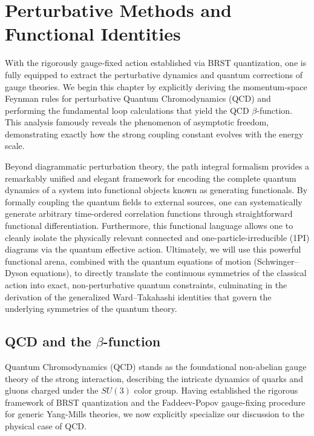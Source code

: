 \chapter[Perturbative Methods and Functional Identities]{Perturbative Methods and\\Functional Identities}

With the rigorously gauge-fixed action established via BRST quantization, one is fully equipped to extract the perturbative dynamics and quantum corrections of gauge theories. We begin this chapter by explicitly deriving the momentum-space Feynman rules for perturbative Quantum Chromodynamics (QCD) and performing the fundamental loop calculations that yield the QCD \(\beta\)-function. This analysis famously reveals the phenomenon of asymptotic freedom, demonstrating exactly how the strong coupling constant evolves with the energy scale.

Beyond diagrammatic perturbation theory, the path integral formalism provides a remarkably unified and elegant framework for encoding the complete quantum dynamics of a system into functional objects known as generating functionals. By formally coupling the quantum fields to external sources, one can systematically generate arbitrary time-ordered correlation functions through straightforward functional differentiation. Furthermore, this functional language allows one to cleanly isolate the physically relevant connected and one-particle-irreducible (1PI) diagrams via the quantum effective action. Ultimately, we will use this powerful functional arena, combined with the quantum equations of motion (Schwinger--Dyson equations), to directly translate the continuous symmetries of the classical action into exact, non-perturbative quantum constraints, culminating in the derivation of the generalized Ward--Takahashi identities that govern the underlying symmetries of the quantum theory.

\section{QCD and the $\beta$-function}

Quantum Chromodynamics (QCD) stands as the foundational non-abelian gauge theory of the strong interaction, describing the intricate dynamics of quarks and gluons charged under the \(SU(3)\) color group. Having established the rigorous framework of BRST quantization and the Faddeev-Popov gauge-fixing procedure for generic Yang-Mills theories, we now explicitly specialize our discussion to the physical case of QCD.

